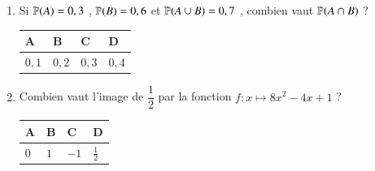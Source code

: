 \documentclass[oneside,12pt]{exam}          %
\begin{document}
\begin{enumerate}[label=\underline{Question \no\arabic*} :  , leftmargin=* , itemsep=5mm]
		

	\item Si ${\mathbb P}(A) = 0,3$ , ${\mathbb P}(B) = 0,6$ et ${\mathbb P}(A \cup B) = 0,7$ , combien vaut ${\mathbb P}(A \cap B)$ ?
	
		\hspace{\linewidth-\textwidth}
		\renewcommand{\arraystretch}{1.5}
		\begin{tabular}{| P{0.22\textwidth} | P{0.22\textwidth} | P{0.22\textwidth} | P{0.22\textwidth} |} \hline
			A & B & C & D \\ \hline
			$0,1$ & $0,2$ & $0,3$ & $0,4$ \\ \hline
		\end{tabular}
		
		

	\item Combien vaut l'image de $\dfrac{1}{2}$ par la fonction $f : x \mapsto 8x^2 -4x +1$ ?
	
		\hspace{\linewidth-\textwidth}
		\renewcommand{\arraystretch}{1.5}
		\begin{tabular}{| P{0.22\textwidth} | P{0.22\textwidth} | P{0.22\textwidth} | P{0.22\textwidth} |} \hline
			A & B & C & D \\ \hline
			$0$ & $1$ & $-1$ & $\frac{1}{2}$ \\ \hline
		\end{tabular}	
		
\end{enumerate}
\end{document}
